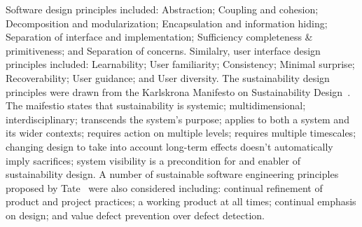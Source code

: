Software design principles included: Abstraction; Coupling and cohesion; Decomposition and modularization; Encapsulation and information hiding; Separation of interface and implementation; Sufficiency completeness \& primitiveness; and Separation of concerns. Similalry, user interface design principles included: Learnability; User familiarity; Consistency; Minimal surprise; Recoverability; User guidance; and User diversity. The sustainability design principles were drawn from the Karlskrona Manifesto on Sustainability Design~\cite{Becker:2014}. The maifestio states that sustainability is systemic; multidimensional; interdisciplinary; transcends the system's purpose; applies to both a system and its wider contexts; requires action on multiple levels; requires multiple timescales; changing design to take into account long-term effects doesn't automatically imply sacrifices; system visibility is a precondition for and enabler of sustainability design.
A number of sustainable software engineering principles proposed by Tate~\cite{tate2005} were also considered including: continual refinement of product and project practices; a working product at all times; continual emphasis on design; and value defect prevention over defect detection.

